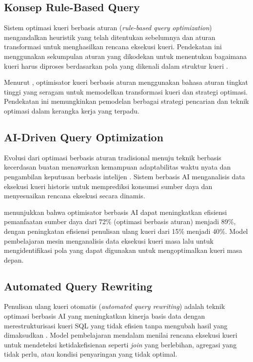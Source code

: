 \subsection{Konsep Rule-Based Query}

Sistem optimasi kueri berbasis aturan (\textit{rule-based query optimization}) mengandalkan heuristik yang telah ditentukan sebelumnya dan aturan transformasi untuk menghasilkan rencana eksekusi kueri. Pendekatan ini menggunakan sekumpulan aturan yang dikodekan untuk menentukan bagaimana kueri harus diproses berdasarkan pola yang dikenali dalam struktur kueri \parencite{shah2024ai}.

Menurut \textcite{finance1994rule}, optimisator kueri berbasis aturan menggunakan bahasa aturan tingkat tinggi yang seragam untuk memodelkan transformasi kueri dan strategi optimasi. Pendekatan ini memungkinkan pemodelan berbagai strategi pencarian dan teknik optimasi dalam kerangka kerja yang terpadu.

\subsection{AI-Driven Query Optimization}

Evolusi dari optimasi berbasis aturan tradisional menuju teknik berbasis kecerdasan buatan menawarkan kemampuan adaptabilitas waktu nyata dan pengambilan keputusan berbasis intelijen \parencite{shah2024ai}. Sistem berbasis AI menganalisis data eksekusi kueri historis untuk memprediksi konsumsi sumber daya dan menyesuaikan rencana eksekusi secara dinamis.

\textcite{shah2024ai} menunjukkan bahwa optimisator berbasis AI dapat meningkatkan efisiensi pemanfaatan sumber daya dari 72\% (optimasi berbasis aturan) menjadi 89\%, dengan peningkatan efisiensi penulisan ulang kueri dari 15\% menjadi 40\%. Model pembelajaran mesin menganalisis data eksekusi kueri masa lalu untuk mengidentifikasi pola yang dapat digunakan untuk mengoptimalkan kueri masa depan.

\subsection{Automated Query Rewriting}

Penulisan ulang kueri otomatis (\textit{automated query rewriting}) adalah teknik optimasi berbasis AI yang meningkatkan kinerja basis data dengan merestrukturisasi kueri SQL yang tidak efisien tanpa mengubah hasil yang dimaksudkan \parencite{shah2024ai}. Model pembelajaran mendalam menilai rencana eksekusi kueri untuk mendeteksi ketidakefisienan seperti \textit{join} yang berlebihan, agregasi yang tidak perlu, atau kondisi penyaringan yang tidak optimal.

